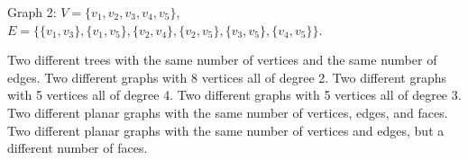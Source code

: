 \documentclass[11pt]{exam}
\begin{document}
\begin{questions}
Graph 2: $V = \{v_1, v_2, v_3, v_4, v_5\}$, $E = \{\{v_1, v_3\}, \{v_1, v_5\}, \{v_2, v_4\}, \{v_2, v_5\}, \{v_3, v_5\}, \{v_4, v_5\}\}$.
\vfill


\newpage


\question Two different trees with the same number of vertices and the same number of edges.
\vfill
\question Two different graphs with 8 vertices all of degree 2.
\vfill
\question Two different graphs with 5 vertices all of degree 4.
\vfill
\question Two different graphs with 5 vertices all of degree 3.
\vfill
{}
\question Two different planar graphs with the same number of vertices, edges, and faces.
\vfill
\question Two different planar graphs with the same number of vertices and edges, but a different number of faces.


\end{questions}

\newpage
\end{document}
